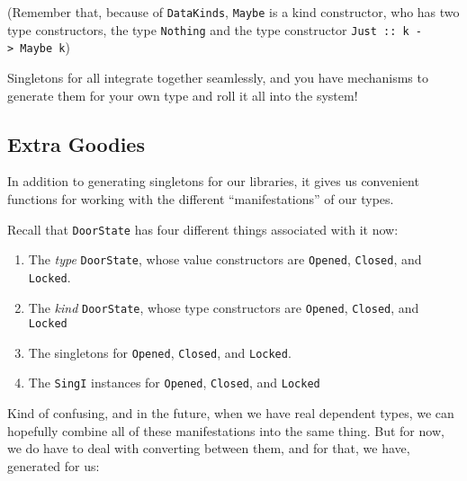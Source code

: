 \documentclass[]{article}
\begin{document}
(Remember that, because of \texttt{DataKinds}, \texttt{Maybe} is a kind
constructor, who has two type constructors, the type
\texttt{\textquotesingle{}Nothing} and the type constructor
\texttt{\textquotesingle{}Just\ ::\ k\ -\textgreater{}\ Maybe\ k})

Singletons for all integrate together seamlessly, and you have mechanisms to
generate them for your own type and roll it all into the system!

\subsection{Extra Goodies}\label{extra-goodies}

In addition to generating singletons for our libraries, it gives us convenient
functions for working with the different ``manifestations'' of our types.

Recall that \texttt{DoorState} has four different things associated with it now:

\begin{enumerate}
\def\labelenumi{\arabic{enumi}.}
\tightlist
\item
  The \emph{type} \texttt{DoorState}, whose value constructors are
  \texttt{Opened}, \texttt{Closed}, and \texttt{Locked}.
\item
  The \emph{kind} \texttt{DoorState}, whose type constructors are
  \texttt{\textquotesingle{}Opened}, \texttt{\textquotesingle{}Closed}, and
  \texttt{\textquotesingle{}Locked}
\item
  The singletons for \texttt{\textquotesingle{}Opened},
  \texttt{\textquotesingle{}Closed}, and \texttt{\textquotesingle{}Locked}.
\item
  The \texttt{SingI} instances for \texttt{\textquotesingle{}Opened},
  \texttt{\textquotesingle{}Closed}, and
  \texttt{\textquotesingle{}Locked\textquotesingle{}}
\end{enumerate}

Kind of confusing, and in the future, when we have real dependent types, we can
hopefully combine all of these manifestations into the same thing. But for now,
we do have to deal with converting between them, and for that, we have,
generated for us:
\end{document}
